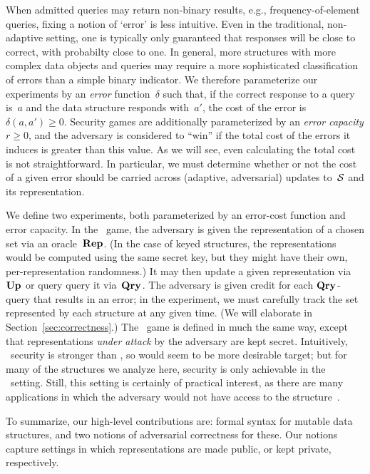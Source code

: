 When admitted queries may return non-binary results, e.g., frequency-of-element queries, fixing a notion of `error' is less intuitive.  Even in the traditional, non-adaptive setting, one is typically only guaranteed that responses will be close to correct, with probabilty close to one. In general,
more structures with more complex data objects and queries may require a more sophisticated classification of errors than a simple binary indicator.
We therefore parameterize our experiments by an
\emph{error} function~$\delta$ such that, if the correct response to a
query is~$a$ and the data structure responds with~$a'$, the cost of the error is
$\delta(a,a') \geq 0$.
%
Security games are additionally parameterized by an \emph{error capacity}
$r\geq0$, and the adversary is considered to ``win'' if the total cost of the
errors it induces is greater than this value.  As we will see, even calculating
the total cost is not straightforward.  In particular, we must determine whether
or not the cost of a given error should be carried across (adaptive,
adversarial) updates to~$\mathcal{S}$ and its representation.

We define two experiments, both parameterized by an error-cost function and
error capacity.
%
In the \errep\ game, the adversary is given the representation of a chosen set
via an oracle~$\textup{\textbf{Rep}}\hspace{0.5pt}$. (In the case of keyed structures, the representations
would be computed using the same secret key, but they might have their own,
per-representation randomness.) It may then update a given representation
via~$\textup{\textbf{Up}}\hspace{0.5pt}$ or query query it via~$\textup{\textbf{Qry}}\hspace{0.5pt}$. The adversary is given credit for each
$\textup{\textbf{Qry}}\hspace{0.5pt}$-query that results in an error; in the experiment, we must carefully
track the set represented by each structure at any given time. (We will
elaborate in Section~\ref{sec:correctness}.)
%
The \erreps\ game is defined in much the same way, except that representations
\emph{under attack} by the adversary are kept secret. Intuitively, \errep\
security is stronger than \erreps, so would seem to be more desirable target;
but for many of the structures we analyze here, security is only achievable in
the \erreps\ setting.
%
Still, this setting is certainly of practical interest, as there are many
applications in which the adversary would not have access to the
structure~\cite{gerbet2015power}.

To summarize, our high-level contributions are: formal syntax for
mutable data structures, and two notions of adversarial
correctness for these.  Our notions capture settings in which representations
are made public, or kept private, respectively.

